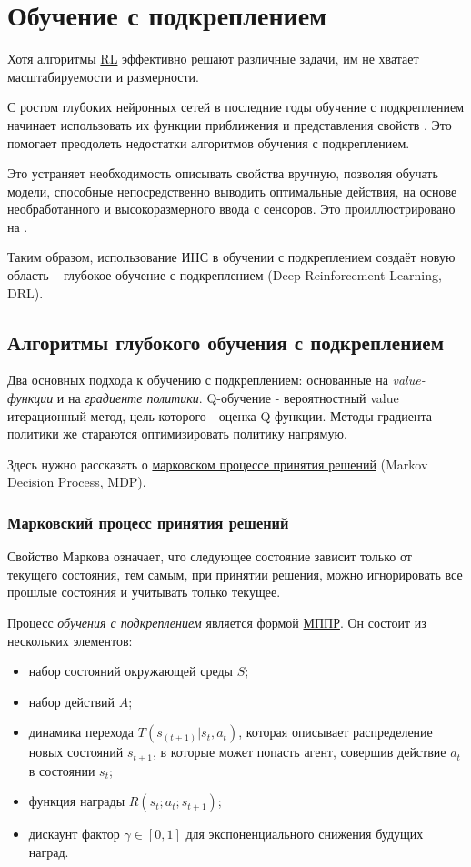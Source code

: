 \section{Обучение с подкреплением} \label{ch1:rl}

Хотя алгоритмы \hyperref[acr:rl]{RL} эффективно решают различные задачи, им не хватает масштабируемости и размерности.

С ростом глубоких нейронных сетей в последние годы обучение с подкреплением начинает использовать их функции приближения и представления свойств \cite{HORNIK1991251}. Это помогает преодолеть недостатки алгоритмов обучения с подкреплением.

Это устраняет необходимость описывать свойства вручную, позволяя обучать модели, способные непосредственно выводить оптимальные действия, на основе необработанного и высокоразмерного ввода с сенсоров. Это проиллюстрировано на .

Таким образом, использование ИНС в обучении с подкреплением создаёт новую область – глубокое обучение с подкреплением (Deep Reinforcement Learning, DRL).


\subsection{Алгоритмы глубокого обучения с подкреплением}

Два основных подхода к обучению с подкреплением: основанные на \textit{value-функции} и на \textit{градиенте политики}. Q-обучение - вероятностный value итерационный метод, цель которого - оценка Q-функции. Методы градиента политики же стараются оптимизировать политику напрямую.

Здесь нужно рассказать о \hyperref[acr:mdp]{марковском процессе принятия решений} (Markov Decision Process, MDP).

\subsubsection{Марковский процесс принятия решений}

Свойство Маркова означает, что следующее состояние зависит только от текущего состояния, тем самым, при принятии решения, можно игнорировать все прошлые состояния и учитывать только текущее.

Процесс {\itshape обучения с подкреплением} является формой \hyperref[acr:mdp]{МППР}. Он состоит из нескольких элементов:

\begin{itemize}
	\item набор состояний окружающей среды $S$;
	\item набор действий $A$;
	\item динамика перехода $T(s_{(t+1)}|s_t, a_t)$, которая описывает распределение новых состояний $s_{t+1}$, в которые может попасть агент, совершив действие $a_t$ в состоянии $s_t$;
	\item функция награды $R(s_t; a_t; s_{t+1})$;
	\item дискаунт фактор $\gamma \in [0, 1]$ для экспоненциального снижения будущих наград.
\end{itemize}

